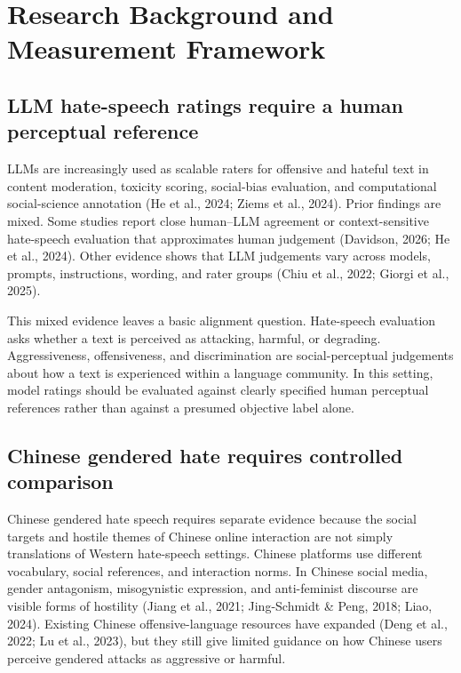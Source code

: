 \documentclass[a4paper,fleqn,review,longmktitle]{cas-sc}
\begin{document}
\section{Research Background and Measurement Framework}
\label{sec:background-framework}

\subsection{LLM hate-speech ratings require a human perceptual reference}

LLMs are increasingly used as scalable raters for offensive and hateful text in content moderation, toxicity scoring, social-bias evaluation, and computational social-science annotation (He et al., 2024; Ziems et al., 2024). Prior findings are mixed. Some studies report close human--LLM agreement or context-sensitive hate-speech evaluation that approximates human judgement (Davidson, 2026; He et al., 2024). Other evidence shows that LLM judgements vary across models, prompts, instructions, wording, and rater groups (Chiu et al., 2022; Giorgi et al., 2025).

This mixed evidence leaves a basic alignment question. Hate-speech evaluation asks whether a text is perceived as attacking, harmful, or degrading. Aggressiveness, offensiveness, and discrimination are social-perceptual judgements about how a text is experienced within a language community. In this setting, model ratings should be evaluated against clearly specified human perceptual references rather than against a presumed objective label alone.

\subsection{Chinese gendered hate requires controlled comparison}

Chinese gendered hate speech requires separate evidence because the social targets and hostile themes of Chinese online interaction are not simply translations of Western hate-speech settings. Chinese platforms use different vocabulary, social references, and interaction norms. In Chinese social media, gender antagonism, misogynistic expression, and anti-feminist discourse are visible forms of hostility (Jiang et al., 2021; Jing-Schmidt \& Peng, 2018; Liao, 2024). Existing Chinese offensive-language resources have expanded (Deng et al., 2022; Lu et al., 2023), but they still give limited guidance on how Chinese users perceive gendered attacks as aggressive or harmful.
\end{document}
